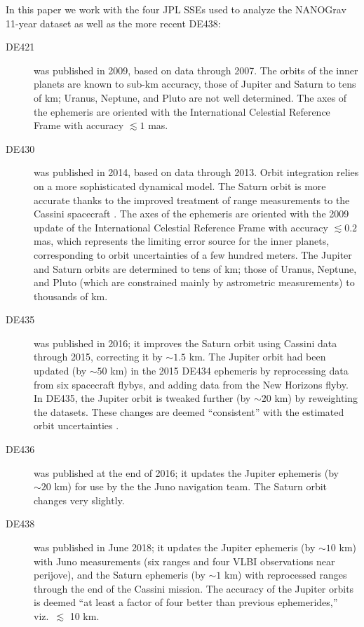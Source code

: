 \documentclass[iop,apj,twocolappendix]{emulateapj}
\begin{document}
In this paper we work with the four JPL SSEs used to analyze the NANOGrav 11-year dataset \citep{2018ApJ...859...47A} as well as the more recent DE438:
%
\begin{description}
%
\item[DE421 \citep{2009IPNPR.178C...1F}] was published in 2009, based on data through 2007. The orbits of the inner planets are known to sub-km accuracy, those of Jupiter and Saturn to tens of km; Uranus, Neptune, and Pluto are not well determined. The axes of the ephemeris are oriented with the International Celestial Reference Frame \citep{Ma_1998} with accuracy $\lesssim 1$ mas.
%
\item[DE430 \citep{2014IPNPR.196C...1F}] was published in 2014, based on data through 2013. Orbit integration relies on a more sophisticated dynamical model. The Saturn orbit is more accurate thanks to the improved treatment of range measurements to the Cassini spacecraft \citep{PhysRevD.89.102002}.
The axes of the ephemeris are oriented with the 2009 update of the International Celestial Reference Frame \citep{2015AJ....150...58F} with accuracy $\lesssim 0.2$ mas, which represents the limiting error source for the inner planets, corresponding to orbit uncertainties of a few hundred meters. The Jupiter and Saturn orbits are determined to tens of km; those of Uranus, Neptune, and Pluto (which are constrained mainly by astrometric measurements) to thousands of km. 
%
\item[DE435 \citep{de435}] was published in 2016; it improves the Saturn orbit using Cassini data through 2015, correcting it by $\sim 1.5$ km. The Jupiter orbit had been updated (by $\sim 50$ km) in the 2015 DE434 ephemeris \citep{de434} by reprocessing data from six spacecraft flybys, and adding data from the New Horizons flyby. In DE435, the Jupiter orbit is tweaked further (by $\sim 20$ km) by reweighting the datasets. These changes are deemed ``consistent'' with the estimated orbit uncertainties \citep{de434,de435}.
%
\item[DE436 \citep{de436}] was published at the end of 2016; it updates the Jupiter ephemeris (by $\sim 20$ km) for use by the the Juno navigation team. The Saturn orbit changes very slightly.
%
\item[DE438 \citep{de438}] was published in June 2018; it updates the Jupiter ephemeris (by $\sim 10$ km) with Juno measurements (six ranges and four VLBI observations near perijove), and the Saturn ephemeris (by $\sim 1$ km) with reprocessed ranges through the end of the Cassini mission. The accuracy of the Jupiter orbits is deemed ``at least a factor of four better than previous ephemerides,'' viz.\ $\lesssim$ 10 km.
%
\end{description}
\end{document}
